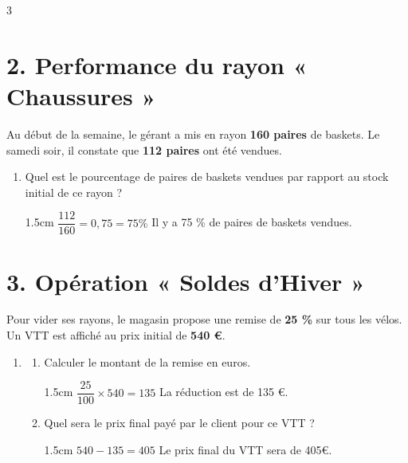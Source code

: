 \documentclass[a4paper]{book}
\begin{document}
{\begin{exerciceNote}{3}
        \section*{2. Performance du rayon « Chaussures »}
        Au début de la semaine, le gérant a mis en rayon \textbf{160 paires} de baskets. Le samedi soir, il constate que \textbf{112 paires} ont été vendues.
        
        \begin{enumerate}[resume, leftmargin=*]
            \item Quel est le pourcentage de paires de baskets vendues par rapport au stock initial de ce rayon ?
    
            \begin{ZoneReponse}{1.5cm}    
                $\dfrac{112}{160}=0,75=75\%$ 
                \quad Il y a 75 \% de paires de baskets vendues.
            \end{ZoneReponse}
        \end{enumerate}
        
        \section*{3. Opération « Soldes d'Hiver »}
        Pour vider ses rayons, le magasin propose une remise de \textbf{25 \%} sur tous les vélos. Un VTT est affiché au prix initial de \textbf{540 \euro}.

        \begin{enumerate}[resume, leftmargin=*]
            \item \begin{enumerate}[label=\alph*), leftmargin=*]
                \item Calculer le montant de la remise en euros.
                
                \begin{ZoneReponse}{1.5cm}        
                    $\dfrac{25}{100}\times540=135$
                    \quad La réduction est de 135 €.
                \end{ZoneReponse}
   
                \item Quel sera le prix final payé par le client pour ce VTT ?
                
                \begin{ZoneReponse}{1.5cm}
                    $540-135=405$ \quad Le prix final du VTT sera de 405€.
                \end{ZoneReponse}
            \end{enumerate}
        \end{enumerate}
        

\end{exerciceNote}}
\end{document}
